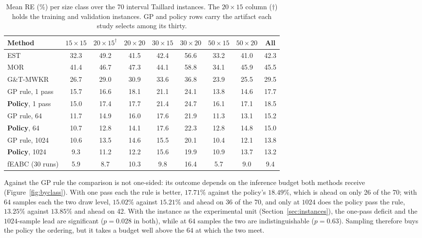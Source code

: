\documentclass[preprint,12pt]{elsarticle}
\theoremstyle{definition}
\theoremstyle{remark}
\begin{document}
\begin{table}[t]
\centering\small
\caption{Mean RE (\%) per size class over the 70 interval Taillard
instances. The $20{\times}15$ column ($\dagger$) holds the training and
validation instances. GP and policy rows carry the artifact each study
selects among its thirty.}
\label{tab:seventy}
\setlength{\tabcolsep}{3.5pt}
\begin{tabular}{lcccccccc}
\toprule
Method & $15{\times}15$ & $20{\times}15^{\dagger}$ & $20{\times}20$ &
$30{\times}15$ & $30{\times}20$ & $50{\times}15$ & $50{\times}20$ &
All \\
\midrule
EST & 32.3 & 49.2 & 41.5 & 42.4 & 56.6 & 33.2 & 41.0 & 42.3 \\
MOR & 41.4 & 46.7 & 47.3 & 44.1 & 58.8 & 34.1 & 45.9 & 45.5 \\
G\&T-MWKR & 26.7 & 29.0 & 30.9 & 33.6 & 36.8 & 23.9 & 25.5 & 29.5 \\
\midrule
GP rule, 1 pass & 15.7 & 16.6 & 18.1 & 21.1 & 24.1 & 13.8 & 14.6 &
17.7 \\
\textbf{Policy}, 1 pass & 15.0 & 17.4 & 17.7 & 21.4 & 24.7 & 16.1 &
17.1 & 18.5 \\
\midrule
GP rule, 64 & 11.7 & 14.9 & 16.0 & 17.6 & 21.9 & 11.3 & 13.1 &
15.2 \\
\textbf{Policy}, 64 & 10.7 & 12.8 & 14.1 & 17.6 & 22.3 & 12.8 &
14.8 & 15.0 \\
\midrule
GP rule, 1024 & 10.6 & 13.5 & 14.6 & 15.5 & 20.1 & 10.4 &
12.1 & 13.8 \\
\textbf{Policy}, 1024 & 9.3 & 11.2 & 12.2 & 15.6 & 19.9 &
10.9 & 13.7 & 13.2 \\
\midrule
fEABC (30 runs) & 5.9 & 8.7 & 10.3 & 9.8 & 16.4 & 5.7 & 9.0 & 9.4 \\
\bottomrule
\end{tabular}
\end{table}


Against the GP rule the comparison is not one-sided: its outcome
depends on the inference budget both methods receive
(Figure~\ref{fig:byclass}). With one pass each the rule is better,
$17.71\%$ against the policy's $18.49\%$, which is ahead on only
26 of the 70; with $64$ samples each the two draw level, $15.02\%$
against $15.21\%$ and ahead on 36 of the 70, and only at $1024$ does
the policy pass the rule, $13.25\%$ against $13.85\%$ and ahead on 42.
With the instance as the experimental unit
(Section~\ref{sec:instances}), the one-pass deficit and the
$1024$-sample lead are significant ($p=0.028$ in both), while at $64$
samples the two are indistinguishable ($p=0.63$). Sampling therefore
buys the policy the ordering, but it takes a budget well above the
$64$ at which the two meet.
\end{document}
